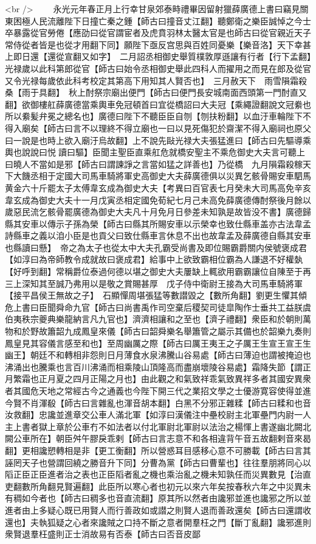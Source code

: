 <br />
　　永光元年春正月上行幸甘泉郊泰畤禮畢因留射獵薛廣德上書曰竊見關東困極人民流離陛下日撞亡秦之鍾【師古曰撞音丈江翻】聽鄭衛之樂臣誠悼之今士卒暴露從官勞倦【應劭曰從官謂宦者及虎賁羽林太醫太官是也師古曰從官親近天子常侍從者皆是也從才用翻下同】願陛下亟反宫思與百姓同憂樂【樂音洛】天下幸甚上即日還【還從宣翻又如字】　二月詔丞相御史舉質樸敦厚遜讓有行者【行下孟翻】光禄歲以此科第郎從官【師古曰始令丞相御史舉此四科人而擢用之而見在郎及從官又令光禄每歲依此科考校定其第高下用知其人賢否也】　三月赦天下　雨雪隕霜殺桑【雨于具翻】　秋上酎祭宗廟出便門【師古曰便門長安城南面西頭第一門酎直又翻】欲御樓舡薛廣德當乘輿車免冠頓首曰宜從橋詔曰大夫冠【乘繩證翻說文冠絭也所以絭髪弁冕之總名也】廣德曰陛下不聽臣臣自刎【刎扶粉翻】以血汙車輪陛下不得入廟矣【師古曰言不以理終不得立廟也一曰以見死傷犯於齋潔不得入廟祠也原父曰一說是也時上欲入廟汙烏故翻】上不說先敺光禄大夫張猛進曰【師古曰先驅導乘輿也說說曰悦讀曰驅】臣聞主聖臣直乘舡危就橋安聖主不乘危御史大夫言可聽上曰曉人不當如是邪【師古曰謂諫諍之言當如猛之詳善也】乃從橋　九月隕霜殺稼天下大饑丞相于定國大司馬車騎將軍史高御史大夫薛廣德俱以災異乞骸骨賜安車駟馬黄金六十斤罷太子太傅韋玄成為御史大夫【考異曰百官表七月癸未大司馬高免辛亥韋玄成為御史大夫十一月戊寅丞相定國免荀紀七月己未高免薛廣德傳酎祭後月餘以歲惡民流乞骸骨罷廣德為御史大夫凡十月免月日參差未知孰是故皆没不書】廣德歸縣其安車以傳示子孫為榮【師古曰縣其所賜安車以示榮幸也致仕縣車盖亦古法韋孟詩縣車之義以洎小臣是也貢父曰致仕縣車言休息不出也故韋孟及薛廣德自縣其安車也縣讀曰懸】　帝之為太子也從太中大夫孔霸受尚書及即位賜霸爵關内侯號褒成君【如淳曰為帝師教令成就故曰褒成君】給事中上欲致霸相位霸為人謙退不好權埶【好呼到翻】常稱爵位泰過何德以堪之御史大夫屢缺上輒欲用霸霸讓位自陳至于再三上深知其至誠乃弗用以是敬之賞賜甚厚　戊子侍中衛尉王接為大司馬車騎將軍【接平昌侯王無故之子】　石顯憚周堪張猛等數譛毀之【數所角翻】劉更生懼其傾危上書曰臣聞舜命九官【師古曰尚書禹作司空棄后稷契司徒皐陶作士垂共工益朕虞伯夷秩宗夔典樂龍納言凡九官也】濟濟相讓和之至也【濟子禮翻】衆臣和於朝則萬物和於野故簫韶九成鳳皇來儀【師古曰韶舜樂名舉簫管之屬示其備也於韶樂九奏則鳳皇見其容儀言感至和也】至周幽厲之際【師古曰厲王夷王之子厲王生宣王宣王生幽王】朝廷不和轉相非怨則日月薄食水泉沸騰山谷易處【師古曰薄迫也謂被掩迫也沸涌出也騰乘也言百川沸涌而相乘陵山頂隆高而盡崩壞陵谷易處】霜降失節【謂正月繁霜也正月夏之四月正陽之月也】由此觀之和氣致祥乖氣致異祥多者其國安異衆者其國危天地之常經古今之通義也今陛下開三代之業招文學之士優游寛容使得並進今賢不肖渾殽【師古曰言雜亂也渾音胡本翻】白黑不分邪正雜糅【師古曰糅和也音汝救翻】忠讒並進章交公車人滿北軍【如淳曰漢儀注中壘校尉主北軍壘門内尉一人主上書者獄上章於公車冇不如法者以付北軍尉北軍尉以法治之楊惲上書遂幽北闕北闕公車所在】朝臣舛午膠戾乖剌【師古曰言志意不和各相違背午音五故翻剌音來曷翻】更相讒愬轉相是非【更工衡翻】所以營惑耳目感移心意不可勝載【師古曰言其誣罔天子也營謂回繞之勝音升下同】分曹為黨【師古曰曹輩也】往往羣朋將同心以䧟正臣正臣進者治之表也正臣䧟者亂之機也乘治亂之機未知孰任而災異數見【治直吏翻數所角翻見賢遍翻】此臣所以寒心者也初元以來六年矣按春秋六年之中災異未有稠如今者也【師古曰稠多也音直流翻】原其所以然者由讒邪並進也讒邪之所以並進者由上多疑心既已用賢人而行善政如或譛之則賢人退而善政還矣【師古曰還謂收還也】夫執狐疑之心者來讒賊之口持不斷之意者開羣枉之門【斷丁亂翻】讒邪進則衆賢退羣枉盛則正士消故易有否泰【師古曰否音皮鄙